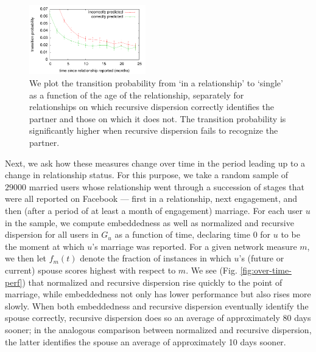 \documentclass{sigchi}
\def\rs{\vspace*{-0.10in}}
\begin{document}
\begin{figure}[t]
\begin{center}
 \includegraphics[width=0.45\textwidth]{plot-trans01b.pdf}
\caption{
 \label{fig:plot-trans01}
We plot the transition probability from `in a relationship' to
`single' as a function of the age of the relationship,
separately for relationships on which recursive dispersion 
correctly identifies the partner and those on which it does not.
The transition probability is significantly higher when 
recursive dispersion fails to recognize the partner.
\rs \rs
}
\end{center}
\end{figure}

Next, we ask how these measures change over time in 
the period leading up to a change in relationship status.
For this purpose, we take a random sample of $29000$ married users
whose relationship went through a succession of stages that were all
reported on Facebook --- first in a relationship, next engagement, 
and then (after a period
of at least a month of engagement) marriage.  For each user $u$ in the sample,
we compute embeddedness as well as normalized
and recursive dispersion for all users in $G_u$ as a function of time,
declaring time $0$ for $u$ to be the moment at which $u$'s marriage was
reported.  For a given network measure $m$,
we then let $f_m(t)$ denote the fraction of instances in 
which $u$'s (future or current) spouse scores highest with respect to $m$.
We see (Fig. \ref{fig:over-time-perf})
that normalized and recursive dispersion rise quickly to the point of
marriage, while embeddedness not only has lower performance but 
also rises more slowly.
When both embeddedness and recursive dispersion 
eventually identify the spouse correctly, recursive dispersion does
so an average of approximately
80 days sooner; in the analogous comparison between 
normalized and recursive dispersion, the latter identifies the spouse
an average of approximately 10 days sooner.
\end{document}
